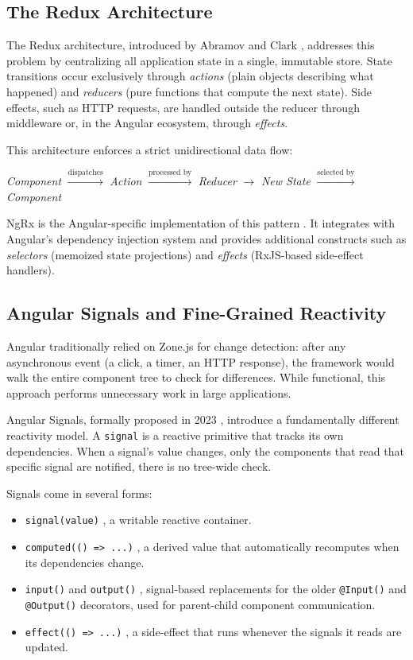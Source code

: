 \subsection{The Redux Architecture}

The Redux architecture, introduced by Abramov and Clark \cite{abramov2015redux}, addresses this problem by centralizing all application state in a single, immutable store. State transitions occur exclusively through \textit{actions} (plain objects describing what happened) and \textit{reducers} (pure functions that compute the next state). Side effects, such as HTTP requests, are handled outside the reducer through middleware or, in the Angular ecosystem, through \textit{effects}.

This architecture enforces a strict unidirectional data flow:

\begin{center}
\textit{Component} $\xrightarrow{\text{dispatches}}$ \textit{Action} $\xrightarrow{\text{processed by}}$ \textit{Reducer} $\rightarrow$ \textit{New State} $\xrightarrow{\text{selected by}}$ \textit{Component}
\end{center}

NgRx is the Angular-specific implementation of this pattern \cite{ngrxDocs}. It integrates with Angular's dependency injection system and provides additional constructs such as \textit{selectors} (memoized state projections) and \textit{effects} (RxJS-based side-effect handlers).

\subsection{Angular Signals and Fine-Grained Reactivity}

Angular traditionally relied on Zone.js for change detection: after any asynchronous event (a click, a timer, an HTTP response), the framework would walk the entire component tree to check for differences. While functional, this approach performs unnecessary work in large applications.

Angular Signals, formally proposed in 2023 \cite{angularSignalsRfc}, introduce a fundamentally different reactivity model. A \texttt{signal} is a reactive primitive that tracks its own dependencies. When a signal's value changes, only the components that read that specific signal are notified, there is no tree-wide check.

Signals come in several forms:
\begin{itemize}[nosep]
  \item \texttt{signal(value)} ,  a writable reactive container.
  \item \texttt{computed(() => ...)} ,  a derived value that automatically recomputes when its dependencies change.
  \item \texttt{input()} and \texttt{output()} ,  signal-based replacements for the older \texttt{@Input()} and \texttt{@Output()} decorators, used for parent-child component communication.
  \item \texttt{effect(() => ...)} ,  a side-effect that runs whenever the signals it reads are updated.
\end{itemize}

